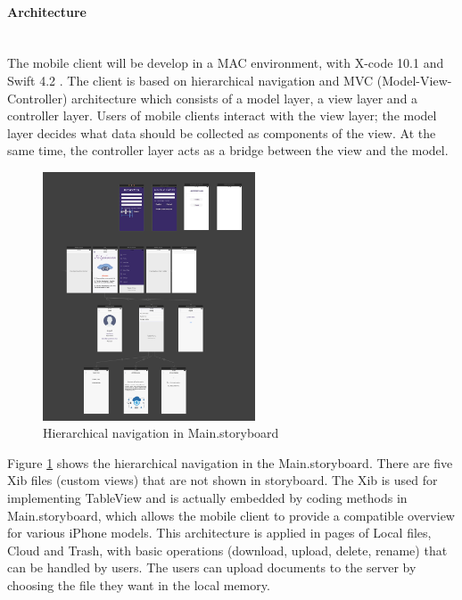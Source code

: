 \documentclass{article}
\begin{document}
\paragraph{Architecture}\mbox{} \\

The mobile client will be develop in a MAC environment, with X-code 10.1 and Swift 4.2 \cite{c1}. The client is based on hierarchical navigation and MVC (Model-View-Controller) architecture which consists of a model layer, a view layer and a controller layer. Users of mobile clients interact with the view layer; the model layer decides what data should be collected as components of the view. At the same time, the controller layer acts as a bridge between the view and the model. 


\begin{figure}[H]
\begin{center}
\includegraphics[width=6.3cm]{1111.png}
\end{center}
\caption{Hierarchical navigation in Main.storyboard}\label{ex777}
\end{figure}

Figure \ref{ex777} shows the hierarchical navigation in the Main.storyboard. There are five Xib files (custom views) that are not shown in storyboard. The Xib is used for implementing TableView and is actually embedded by coding methods in Main.storyboard, which allows the mobile client to provide a compatible overview for various iPhone models. This architecture is applied in pages of Local files, Cloud and Trash, with basic operations (download, upload, delete, rename) that can be handled by users. The users can upload documents to the server by choosing the file they want in the local memory.
\end{document}
